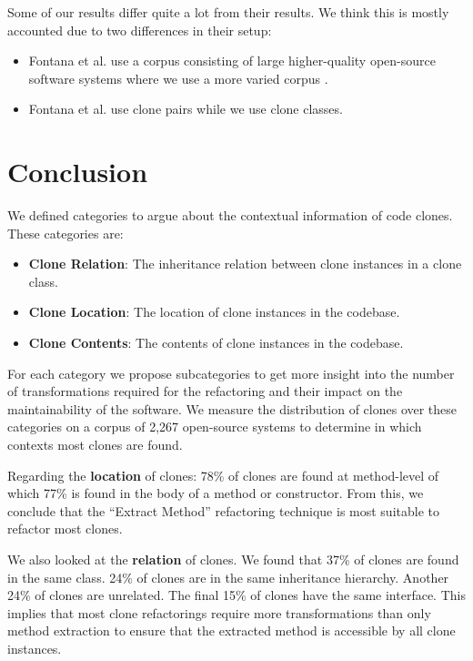 \documentclass[runningheads]{llncs}
\begin{document}
Some of our results differ quite a lot from their results. We think this is mostly accounted due to two differences in their setup:
\begin{itemize}
\item Fontana et al. use a corpus consisting of large higher-quality open-source software systems \cite{tempero2010qualitas} where we use a more varied corpus \cite{githubCorpus2013}.
\item Fontana et al. use clone pairs while we use clone classes.
\end{itemize}



\section{Conclusion}
We defined categories to argue about the contextual information of code clones. These categories are:
\begin{itemize}
  \item \textbf{Clone Relation}: The inheritance relation between clone instances in a clone class.
  \item \textbf{Clone Location}: The location of clone instances in the codebase.
  \item \textbf{Clone Contents}: The contents of clone instances in the codebase.
\end{itemize}
For each category we propose subcategories to get more insight into the number of transformations required for the refactoring and their impact on the maintainability of the software. We measure the distribution of clones over these categories on a corpus of 2,267 open-source systems to determine in which contexts most clones are found.

Regarding the \textbf{location} of clones: 78\% of clones are found at method-level of which 77\% is found in the body of a method or constructor. From this, we conclude that the ``Extract Method'' refactoring technique is most suitable to refactor most clones.

We also looked at the \textbf{relation} of clones. We found that 37\% of clones are found in the same class. 24\% of clones are in the same inheritance hierarchy. Another 24\% of clones are unrelated. The final 15\% of clones have the same interface. This implies that most clone refactorings require more transformations than only method extraction to ensure that the extracted method is accessible by all clone instances.

\printbibliography
\end{document}
